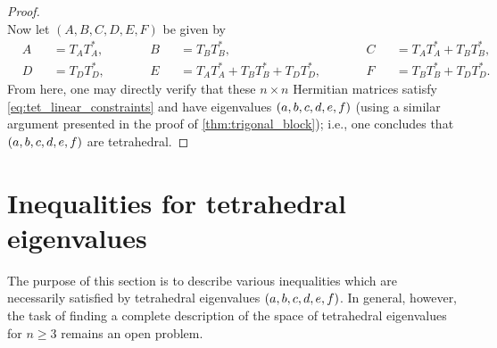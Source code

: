 \documentclass[notitlepage, 10pt]{article}
\begin{document}
\begin{proof}
\begin{equation}
    \end{equation}
    Now let $(A,B,C,D,E,F)$ be given by 
    \begin{equation}
        \begin{alignedat}{6}
            &A &&= T_{A}T_{A}^{*}, \qquad
            &&B &&= T_{B}T_{B}^{*}, \qquad
            &&C &&= T_{A}T_{A}^{*} + T_{B}T_{B}^{*}, \\
            &D &&= T_{D}T_{D}^{*}, \qquad
            &&E &&= T_{A}T_{A}^{*} + T_{B}T_{B}^{*} + T_{D}T_{D}^{*}, \qquad
            &&F &&= T_{B}T_{B}^{*} + T_{D}T_{D}^{*}.
        \end{alignedat}
    \end{equation}
    From here, one may directly verify that these $n\times n$ Hermitian matrices satisfy \cref{eq:tet_linear_constraints}
    and have eigenvalues $(a,b,c,d,e,f)$ (using a similar argument presented in the proof of \cref{thm:trigonal_block}); i.e., one concludes that $(a,b,c,d,e,f)$ are tetrahedral.
\end{proof}

\section{Inequalities for tetrahedral eigenvalues}
\label{sec:ineqs}

The purpose of this section is to describe various inequalities which are necessarily satisfied by tetrahedral eigenvalues $(a,b,c,d,e,f)$.
In general, however, the task of finding a complete description of the space of tetrahedral eigenvalues for $n\geq 3$ remains an open problem.
\end{document}
